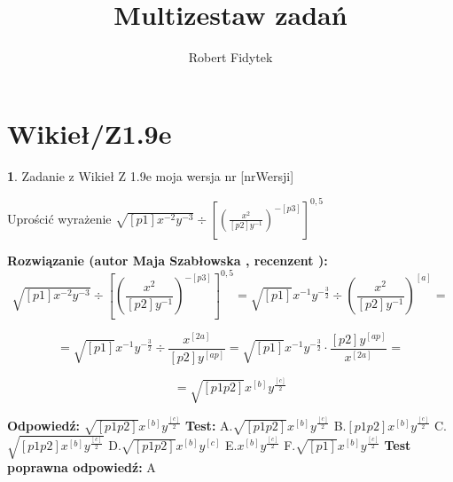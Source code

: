 \documentclass[12pt, a4paper]{article}
\title{Multizestaw zadań}
\author{Robert Fidytek}
\date{}
\theoremstyle{definition} %
\newtheorem{zad}{}
\newcommand{\kategoria}[1]{\section{#1}} %
\newcommand{\zadStart}[1]{\begin{zad}#1\newline} %
\newcommand{\zadStop}{\end{zad}}   %
\newcommand{\rozwStart}[2]{\noindent \textbf{Rozwiązanie (autor #1 , recenzent #2): }\newline} %
\newcommand{\rozwStop}{\newline}                                            %
\newcommand{\odpStart}{\noindent \textbf{Odpowiedź:}\newline}    %
\newcommand{\odpStop}{\newline}                                             %
\newcommand{\testStart}{\noindent \textbf{Test:}\newline} %
\newcommand{\testStop}{\newline} %
\newcommand{\kluczStart}{\noindent \textbf{Test poprawna odpowiedź:}\newline} %
\newcommand{\kluczStop}{\newline} %
\begin{document}
\maketitle


\kategoria{Wikieł/Z1.9e}
\zadStart{Zadanie z Wikieł Z 1.9e moja wersja nr [nrWersji]}


Uprościć wyrażenie $\sqrt{[p1]x^{-2}y^{-3}}\div[(\frac{x^{2}}{[p2]y^{-1}})^{-[p3]}]^{0,5}$
\zadStop

\rozwStart{Maja Szabłowska}{}
$$\sqrt{[p1]x^{-2}y^{-3}}\div\left[\left(\frac{x^{2}}{[p2]y^{-1}}\right)^{-[p3]}\right]^{0,5}=\sqrt{[p1]}x^{-1}y^{-\frac{3}{2}}\div\left(\frac{x^{2}}{[p2]y^{-1}}\right)^{[a]}=$$

$$=\sqrt{[p1]}x^{-1}y^{-\frac{3}{2}}\div \frac{x^{[2a]}}{[p2]y^{[ap]}}= \sqrt{[p1]}x^{-1}y^{-\frac{3}{2}}\cdot \frac{[p2]y^{[ap]}}{x^{[2a]}}=$$

$$=\sqrt{[p1p2]}x^{[b]}y^{\frac{[c]}{2}}$$
\rozwStop


\odpStart
$\sqrt{[p1p2]}x^{[b]}y^{\frac{[c]}{2}}$
\odpStop
\testStart
A.$\sqrt{[p1p2]}x^{[b]}y^{\frac{[c]}{2}}$
B.$[p1p2]x^{[b]}y^{\frac{[c]}{2}}$
C.$\sqrt{[p1p2]x^{[b]}y^{\frac{[c]}{2}}}$
D.$\sqrt{[p1p2]}x^{[b]}y^{[c]}$
E.$x^{[b]}y^{\frac{[c]}{2}}$
F.$\sqrt{[p1]}x^{[b]}y^{\frac{[c]}{2}}$
\testStop
\kluczStart
A
\kluczStop
\end{document}
